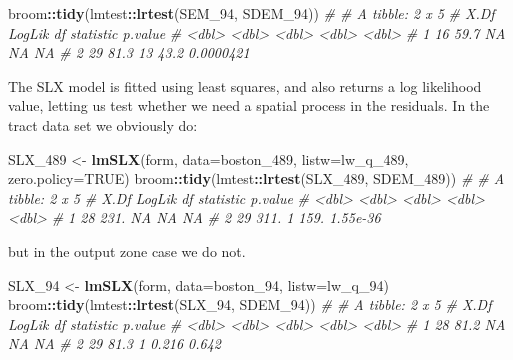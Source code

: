 \documentclass[]{book}
\newenvironment{Shaded}{\begin{snugshade}}{\end{snugshade}}
\newcommand{\CommentTok}[1]{\textcolor[rgb]{0.56,0.35,0.01}{\textit{#1}}}
\newcommand{\DataTypeTok}[1]{\textcolor[rgb]{0.13,0.29,0.53}{#1}}
\newcommand{\DecValTok}[1]{\textcolor[rgb]{0.00,0.00,0.81}{#1}}
\newcommand{\KeywordTok}[1]{\textcolor[rgb]{0.13,0.29,0.53}{\textbf{#1}}}
\newcommand{\NormalTok}[1]{#1}
\newcommand{\OperatorTok}[1]{\textcolor[rgb]{0.81,0.36,0.00}{\textbf{#1}}}
\newcommand{\OtherTok}[1]{\textcolor[rgb]{0.56,0.35,0.01}{#1}}
\newcommand{\StringTok}[1]{\textcolor[rgb]{0.31,0.60,0.02}{#1}}
\begin{document}
\begin{Shaded}
\begin{Highlighting}[]
\NormalTok{broom}\OperatorTok{::}\KeywordTok{tidy}\NormalTok{(lmtest}\OperatorTok{::}\KeywordTok{lrtest}\NormalTok{(SEM_}\DecValTok{94}\NormalTok{, SDEM_}\DecValTok{94}\NormalTok{))}
\CommentTok{# # A tibble: 2 x 5}
\CommentTok{#    X.Df LogLik    df statistic    p.value}
\CommentTok{#   <dbl>  <dbl> <dbl>     <dbl>      <dbl>}
\CommentTok{# 1    16   59.7    NA      NA   NA        }
\CommentTok{# 2    29   81.3    13      43.2  0.0000421}
\end{Highlighting}
\end{Shaded}

The SLX model is fitted using least squares, and also returns a log likelihood value, letting us test whether we need a spatial process in the residuals. In the tract data set we obviously do:

\begin{Shaded}
\begin{Highlighting}[]
\NormalTok{SLX_}\DecValTok{489}\NormalTok{ <-}\StringTok{ }\KeywordTok{lmSLX}\NormalTok{(form, }\DataTypeTok{data=}\NormalTok{boston_}\DecValTok{489}\NormalTok{, }\DataTypeTok{listw=}\NormalTok{lw_q_}\DecValTok{489}\NormalTok{, }\DataTypeTok{zero.policy=}\OtherTok{TRUE}\NormalTok{)}
\NormalTok{broom}\OperatorTok{::}\KeywordTok{tidy}\NormalTok{(lmtest}\OperatorTok{::}\KeywordTok{lrtest}\NormalTok{(SLX_}\DecValTok{489}\NormalTok{, SDEM_}\DecValTok{489}\NormalTok{))}
\CommentTok{# # A tibble: 2 x 5}
\CommentTok{#    X.Df LogLik    df statistic   p.value}
\CommentTok{#   <dbl>  <dbl> <dbl>     <dbl>     <dbl>}
\CommentTok{# 1    28   231.    NA       NA  NA       }
\CommentTok{# 2    29   311.     1      159.  1.55e-36}
\end{Highlighting}
\end{Shaded}

but in the output zone case we do not.

\begin{Shaded}
\begin{Highlighting}[]
\NormalTok{SLX_}\DecValTok{94}\NormalTok{ <-}\StringTok{ }\KeywordTok{lmSLX}\NormalTok{(form, }\DataTypeTok{data=}\NormalTok{boston_}\DecValTok{94}\NormalTok{, }\DataTypeTok{listw=}\NormalTok{lw_q_}\DecValTok{94}\NormalTok{)}
\NormalTok{broom}\OperatorTok{::}\KeywordTok{tidy}\NormalTok{(lmtest}\OperatorTok{::}\KeywordTok{lrtest}\NormalTok{(SLX_}\DecValTok{94}\NormalTok{, SDEM_}\DecValTok{94}\NormalTok{))}
\CommentTok{# # A tibble: 2 x 5}
\CommentTok{#    X.Df LogLik    df statistic p.value}
\CommentTok{#   <dbl>  <dbl> <dbl>     <dbl>   <dbl>}
\CommentTok{# 1    28   81.2    NA    NA      NA    }
\CommentTok{# 2    29   81.3     1     0.216   0.642}
\end{Highlighting}
\end{Shaded}
\end{document}
